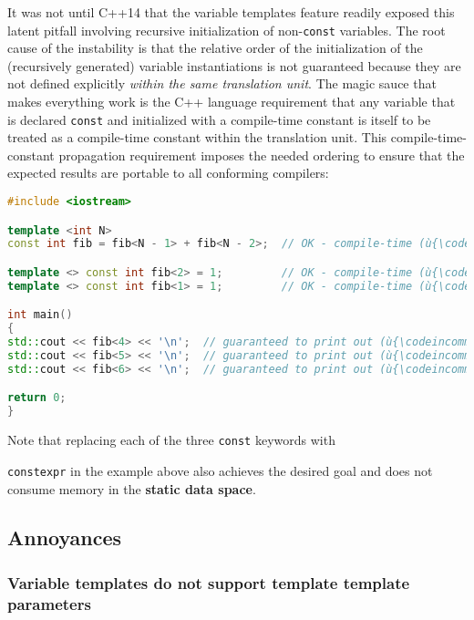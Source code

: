{\noindent It was not until C++14 that the variable templates feature
readily exposed this latent pitfall involving recursive initialization
of non-\texttt{const} variables. The root cause of the instability is
that the relative order of the initialization of the (recursively
generated) variable instantiations is not guaranteed because they are
not defined explicitly \emph{within the same translation unit}. The
magic sauce that makes everything work is the C++ language requirement
that any variable that is declared \texttt{const} and initialized with a
compile-time constant is itself to be treated as a compile-time constant
within the translation unit. This compile-time-constant propagation
requirement imposes the needed ordering to ensure that the expected
results are portable to all conforming compilers:

\begin{lstlisting}[language=C++]
#include <iostream>

template <int N>
const int fib = fib<N - 1> + fib<N - 2>;  // OK - compile-time (ù{\codeincomments{const}}ù).

template <> const int fib<2> = 1;         // OK - compile-time (ù{\codeincomments{const}}ù).
template <> const int fib<1> = 1;         // OK - compile-time (ù{\codeincomments{const}}ù).

int main()
{
std::cout << fib<4> << '\n';  // guaranteed to print out (ù{\codeincomments{3}}ù)
std::cout << fib<5> << '\n';  // guaranteed to print out (ù{\codeincomments{5}}ù)
std::cout << fib<6> << '\n';  // guaranteed to print out (ù{\codeincomments{8}}ù)

return 0;
}
\end{lstlisting}

\noindent Note that replacing each of the three \texttt{const} keywords with
{\texttt{constexpr} in the example above also achieves the
desired goal and does not consume memory in the \textbf{static data
space}.

\subsection[Annoyances]{Annoyances}\label{annoyances}

\subsubsection[Variable templates do not support template template parameters]{Variable templates do not support template template parameters}\label{variable-templates-do-not-support-template-template-parameters}

}}

